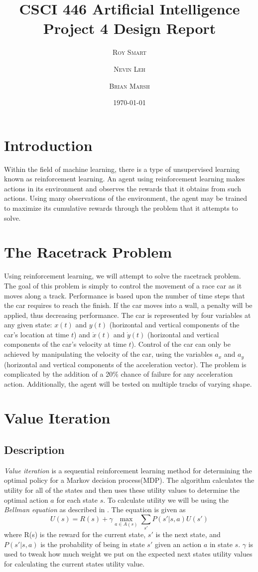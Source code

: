 \documentclass{article}
\title{\vspace{-15mm}\fontsize{24pt}{10pt}\selectfont\textbf{CSCI 446 Artificial Intelligence \\[2mm] Project 4 Design Report} } %
\date{\today}
\author{
\large
\textsc{Roy Smart} \and \textsc{Nevin Leh} \and \textsc{Brian Marsh}\\[2mm] %
}
\begin{document}
	\maketitle %
	\thispagestyle{fancy} %
	\normalsize

	\section{Introduction}
		Within the field of machine learning, there is a type of unsupervised learning known as reinforcement learning.  An agent using reinforcement learning makes actions in its environment and observes the rewards that it obtains from such actions.  Using many observations of the environment, the agent may be trained to maximize its cumulative rewards through the problem that it attempts to solve.
	\section{The Racetrack Problem}
		Using reinforcement learning, we will attempt to solve the racetrack problem.  The goal of this problem is simply to control the movement of a race car as it moves along a track.  Performance is based upon the number of time steps that the car requires to reach the finish.  If the car moves into a wall, a penalty will be applied, thus decreasing performance.  The car is represented by four variables at any given state: $x(t)$ and $y(t)$ (horizontal and vertical components of the car's location at time $t$) and $\dot{x}(t)$ and $\dot{y}(t)$ (horizontal and vertical components of the car's velocity at time $t$).  Control of the car can only be achieved by manipulating the velocity of the car, using the variables $a_x$ and $a_y$ (horizontal and vertical components of the acceleration vector).  The problem is complicated by the addition of a 20\% chance of failure for any acceleration action.  Additionally, the agent will be tested on multiple tracks of varying shape.
	\section{Value Iteration}
		\subsection{Description}
			\textit{Value iteration} is a sequential reinforcement learning method for determining the optimal policy for a Markov decision process(MDP)\cite{Yu2013}. The algorithm calculates the utility for all of the states and then uses these utility values to determine the optimal action $a$ for each state $s$. To calculate utility we will be using the \textit{Bellman equation} as described in \cite{ai}. The equation is given as			
			\begin{equation}
				U(s) = R(s) + \gamma \max_{a \in A(s)}\sum_{s'} P(s'|s,a)U(s')
			\end{equation}
			where R(s) is the reward for the current state, $s'$ is the next state, and $P(s'|s,a)$ is the probability of being in state $s'$ given an action $a$ in state $s$. $\gamma$ is used to tweak how much weight we put on the expected next states utility values for calculating the current states utility value.
			
\end{document}
